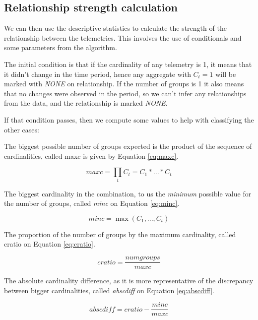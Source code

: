 \hypertarget{relationship-strength-calculation}{%
\subsection{Relationship strength calculation}\label{ch:querypart:heur:rel}}

We can then use the descriptive statistics to calculate the strength of the relationship between the telemetries.
This involves the use of conditionals and some parameters from the algorithm.

The initial condition is that if the cardinality of any telemetry is 1, it means that it didn't change in the time period, hence any aggregate with \(C_t=1\) will be marked with \emph{NONE} on relationship.
If the number of groups is 1 it also means that no changes were observed in the period, so we can't infer any relationships from the data, and the relationship is marked \emph{NONE}.

If that condition passes, then we compute some values to help with classifying the other cases:

The biggest possible number of groups expected is the product of the sequence of cardinalities, called maxc is given by Equation \ref{eq:maxc}.

\begin{equation} \label{eq:maxc}
    maxc = \prod_{t}C_t = C_1 * ... * C_t
\end{equation}

The biggest cardinality in the combination, to us the \emph{minimum} possible value for the number of groups, called \emph{minc} on Equation \ref{eq:minc}.

\begin{equation} \label{eq:minc}
    minc = \max(C_1,...,C_t)
\end{equation}

The proportion of the number of groups by the maximum cardinality, called cratio on Equation \ref{eq:cratio}.

\begin{equation} \label{eq:cratio}
    cratio = \frac{numgroups}{maxc}
\end{equation}

The absolute cardinality difference, as it is more representative of the discrepancy between bigger cardinalities, called \emph{abscdiff} on Equation \ref{eq:abscdiff}.

\begin{equation} \label{eq:abscdiff}
    abscdiff = cratio - \frac{minc}{maxc}
\end{equation}


